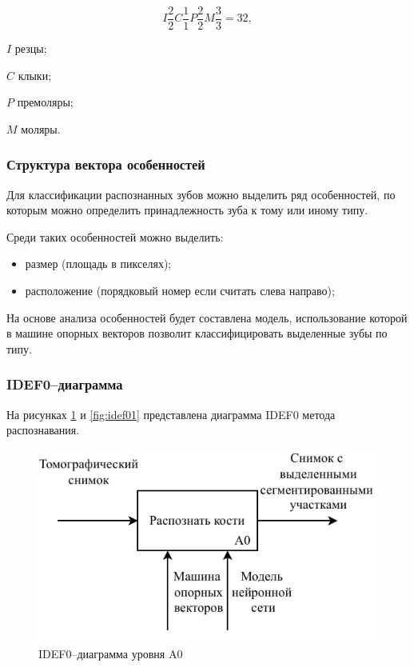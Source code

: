 \begin{equation}
	\label{eq:teeth}
	I\frac{2}{2}C\frac{1}{1}P\frac{2}{2}M\frac{3}{3} = 32,
\end{equation}
\begin{eqexpl}[15mm]
	\item{$I$} резцы;
	\item{$C$} клыки;
	\item{$P$} премоляры;
	\item{$M$} моляры.
\end{eqexpl}

\subsubsection{Структура вектора особенностей}

Для классификации распознанных зубов можно выделить ряд особенностей, по которым можно определить принадлежность зуба к тому или иному типу.

Среди таких особенностей можно выделить:
\begin{itemize}
	\item размер (площадь в пикселях);
	\item расположение (порядковый номер если считать слева направо);
\end{itemize}

На основе анализа особенностей будет составлена модель, использование которой в машине опорных векторов позволит классифицировать выделенные зубы по типу.

\subsubsection{IDEF0--диаграмма}

На рисунках \ref{fig:idef00} и \ref{fig:idef01} представлена диаграмма IDEF0 метода распознавания.

\begin{figure}[H]
	\centering
	\includegraphics[width=\textwidth]{img/idef00.pdf}
	\caption{IDEF0--диаграмма уровня A0}
	\label{fig:idef00}
\end{figure}


